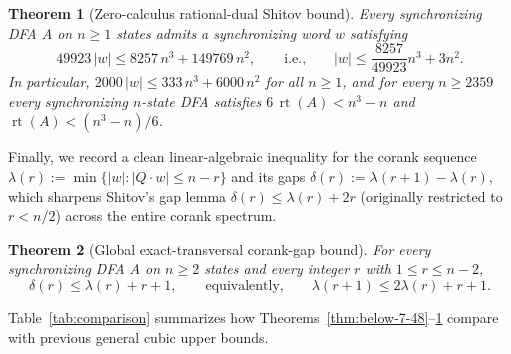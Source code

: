 \documentclass[11pt]{article}
\newtheorem{theorem}{Theorem}[section]
\theoremstyle{definition}
\theoremstyle{remark}
\newcommand{\rt}{\operatorname{rt}}
\begin{document}
\begin{theorem}[Zero-calculus rational-dual Shitov bound]\label{thm:shitov-zero-calc}
Every synchronizing DFA $A$ on $n \ge 1$ states admits a synchronizing word $w$ satisfying
\[
  49923\, |w| \le 8257\, n^3 + 149769\, n^2,
  \qquad\text{i.e.,}\qquad
  |w| \le \frac{8257}{49923} n^3 + 3 n^2.
\]
In particular, $2000\, |w| \le 333\, n^3 + 6000\, n^2$ for all $n \ge 1$, and for every $n \ge 2359$ every synchronizing $n$-state DFA satisfies $6\, \rt(A) < n^3 - n$ and $\rt(A) < (n^3 - n)/6$.
\end{theorem}

Finally, we record a clean linear-algebraic inequality for the corank sequence $\lambda(r) := \min\{|w| : |Q \cdot w| \le n - r\}$ and its gaps $\delta(r) := \lambda(r+1) - \lambda(r)$, which sharpens Shitov's gap lemma $\delta(r) \le \lambda(r) + 2r$ (originally restricted to $r < n/2$) across the entire corank spectrum.

\begin{theorem}[Global exact-transversal corank-gap bound]\label{thm:exact-transversal}
For every synchronizing DFA $A$ on $n \ge 2$ states and every integer $r$ with $1 \le r \le n - 2$,
\[
  \delta(r) \le \lambda(r) + r + 1,
  \qquad\text{equivalently,}\qquad
  \lambda(r + 1) \le 2 \lambda(r) + r + 1.
\]
\end{theorem}

Table~\ref{tab:comparison} summarizes how Theorems~\ref{thm:below-7-48}--\ref{thm:shitov-zero-calc} compare with previous general cubic upper bounds.
\end{document}

